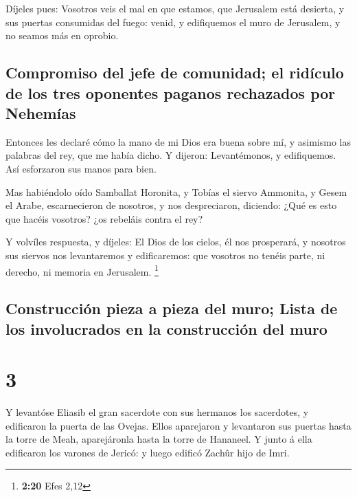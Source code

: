  Díjeles pues: Vosotros veis el mal en que estamos, que
Jerusalem está desierta, y sus puertas consumidas del fuego: venid, y
edifiquemos el muro de Jerusalem, y no seamos más en oprobio.

\hypertarget{compromiso-del-jefe-de-comunidad-el-riduxedculo-de-los-tres-oponentes-paganos-rechazados-por-nehemuxedas}{%
\subsection{Compromiso del jefe de comunidad; el ridículo de los tres
oponentes paganos rechazados por
Nehemías}\label{compromiso-del-jefe-de-comunidad-el-riduxedculo-de-los-tres-oponentes-paganos-rechazados-por-nehemuxedas}}

 Entonces les declaré cómo la mano de mi Dios era buena
sobre mí, y asimismo las palabras del rey, que me había dicho. Y
dijeron: Levantémonos, y edifiquemos. Así esforzaron sus manos para
bien.

 Mas habiéndolo oído Samballat Horonita, y Tobías el
siervo Ammonita, y Gesem el Arabe, escarnecieron de nosotros, y nos
despreciaron, diciendo: ¿Qué es esto que hacéis vosotros? ¿os rebeláis
contra el rey?

 Y volvíles respuesta, y díjeles: El Dios de los cielos,
él nos prosperará, y nosotros sus siervos nos levantaremos y
edificaremos: que vosotros no tenéis parte, ni derecho, ni memoria en
Jerusalem. \footnote{\textbf{2:20} Efes 2,12}

\hypertarget{construcciuxf3n-pieza-a-pieza-del-muro-lista-de-los-involucrados-en-la-construcciuxf3n-del-muro}{%
\subsection{Construcción pieza a pieza del muro; Lista de los
involucrados en la construcción del
muro}\label{construcciuxf3n-pieza-a-pieza-del-muro-lista-de-los-involucrados-en-la-construcciuxf3n-del-muro}}

\hypertarget{section-2}{%
\section{3}\label{section-2}}

 Y levantóse Eliasib el gran sacerdote con sus hermanos
los sacerdotes, y edificaron la puerta de las Ovejas. Ellos aparejaron y
levantaron sus puertas hasta la torre de Meah, aparejáronla hasta la
torre de Hananeel.  Y junto á ella edificaron los varones
de Jericó: y luego edificó Zachûr hijo de Imri.


